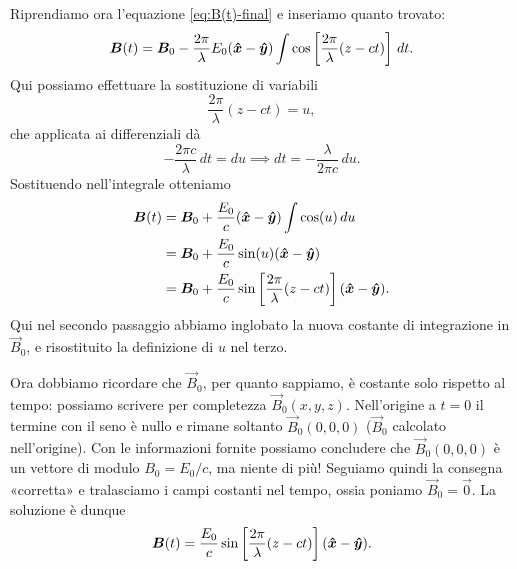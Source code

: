 \documentclass[10pt]{gulartcl}
\begin{document}
\begin{solution}
Riprendiamo ora l’equazione \eqref{eq:B(t)-final} e inseriamo quanto
trovato:
\begin{equation}
    \vec{B}(t)
    = \vec{B}_0 -\frac{2\pi}{\lambda} E_0 (\uvec{x} - \uvec{y})
      \int \cos\left[\frac{2\pi}{\lambda} (z - ct)\right] \, dt.
\end{equation}
Qui possiamo effettuare la sostituzione di variabili
\begin{equation}
    \frac{2\pi}{\lambda} (z - ct) = u,
\end{equation}
che applicata ai differenziali dà
\begin{equation}
    -\frac{2 \pi c}{\lambda} \, dt = du \implies dt
    = -\frac{\lambda}{2 \pi c} \, du.
\end{equation}
Sostituendo nell’integrale otteniamo
\begin{equation}
\begin{split}
    \vec{B}(t)
    &= \vec{B}_0 + \frac{E_0}{c} (\uvec{x} - \uvec{y})
       \int \cos(u) \, du \\
    &= \vec{B}_0 + \frac{E_0}{c} \sin(u) (\uvec{x} - \uvec{y}) \\
    &= \vec{B}_0 + \frac{E_0}{c} \sin\left[\frac{2\pi}{\lambda}(z - ct)\right]
       (\uvec{x} - \uvec{y}).
\end{split}
\end{equation}
Qui nel secondo passaggio abbiamo inglobato la nuova costante di
integrazione in $\vec{B}_0$, e risostituito la definizione di $u$ nel
terzo.

Ora dobbiamo ricordare che $\vec{B}_0$, per quanto sappiamo, è costante
solo rispetto al tempo: possiamo scrivere per completezza $\vec{B}_0(x, y,
z)$. Nell’origine a $t = 0$ il termine con il seno è nullo e rimane
soltanto $\vec{B}_0(0, 0, 0)$ ($\vec{B}_0$ calcolato nell’origine).
Con le informazioni fornite possiamo concludere che $\vec{B}_0(0, 0, 0)$ è
un vettore di modulo $B_0 = E_0 / c$, ma niente di più! Seguiamo quindi
la consegna «corretta» e tralasciamo i campi costanti nel tempo, ossia
poniamo $\vec{B}_0 = \vec{0}$. La soluzione è dunque
\begin{equation}
    \bm{B}(t) = \frac{E_0}{c} \sin\left[\frac{2\pi}{\lambda}(z -
    ct)\right] (\bm{\hat{x}} - \bm{\hat{y}}).
\end{equation}
\end{solution}
\end{document}
